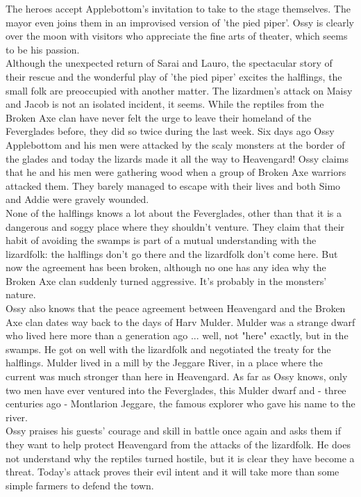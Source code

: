 The heroes accept Applebottom's invitation to take to the stage themselves. The mayor even joins them in an improvised version of 'the pied piper'. Ossy is clearly over the moon with visitors who appreciate the fine arts of theater, which seems to be his passion.\\

Although the unexpected return of Sarai and Lauro, the spectacular story of their rescue and the wonderful play of 'the pied piper' excites the halflings, the small folk are preoccupied with another matter. The lizardmen's attack on Maisy and Jacob is not an isolated incident, it seems. While the reptiles from the Broken Axe clan have never felt the urge to leave their homeland of the Feverglades before, they did so twice during the last week. Six days ago Ossy Applebottom and his men were attacked by the scaly monsters at the border of the glades and today the lizards made it all the way to Heavengard! Ossy claims that he and his men were gathering wood when a group of Broken Axe warriors attacked them. They barely managed to escape with their lives and both Simo and Addie were gravely wounded.\\

None of the halflings knows a lot about the Feverglades, other than that it is a dangerous and soggy place where they shouldn't venture. They claim that their habit of avoiding the swamps is part of a mutual understanding with the lizardfolk: the halflings don't go there and the lizardfolk don't come here. But now the agreement has been broken, although no one has any idea why the Broken Axe clan suddenly turned aggressive. It's probably in the monsters' nature.\\

Ossy also knows that the peace agreement between Heavengard and the Broken Axe clan dates way back to the days of Harv Mulder. Mulder was a strange dwarf who lived here more than a generation ago ... well, not "here" exactly, but in the swamps. He got on well with the lizardfolk and negotiated the treaty for the halflings. Mulder lived in a mill by the Jeggare River, in a place where the current was much stronger than here in Heavengard. As far as Ossy knows, only two men have ever ventured into the Feverglades, this Mulder dwarf and - three centuries ago - Montlarion Jeggare, the famous explorer who gave his name to the river.\\

Ossy praises his guests' courage and skill in battle once again and asks them if they want to help protect Heavengard from the attacks of the lizardfolk. He does not understand why the reptiles turned hostile, but it is clear they have become a threat. Today's attack proves their evil intent and it will take more than some simple farmers to defend the town.\\

